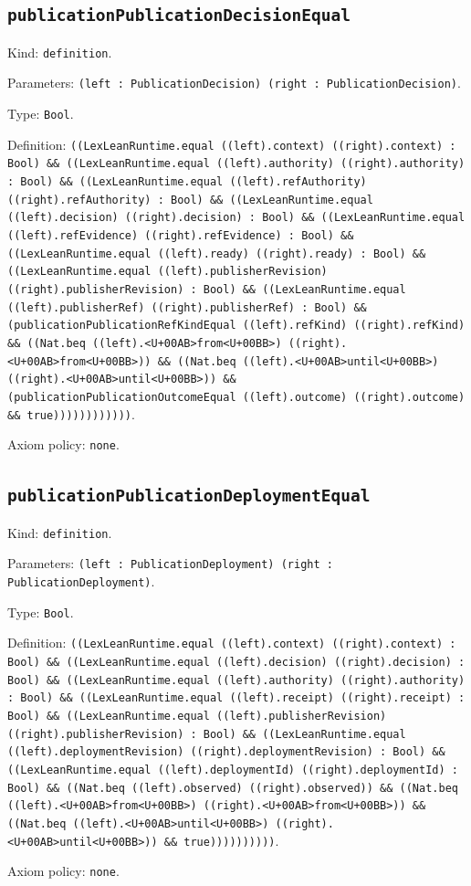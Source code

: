 \documentclass[11pt]{article}
\begin{document}
\subsection*{\texttt{publicationPublicationDecisionEqual}}
\noindent Kind: \texttt{definition}.\par
\noindent Parameters: \texttt{(left : PublicationDecision) (right : PublicationDecision)}.\par
\noindent Type: \texttt{Bool}.\par
\noindent Definition: \texttt{((LexLeanRuntime.equal ((left).context) ((right).context) : Bool) \&\& ((LexLeanRuntime.equal ((left).authority) ((right).authority) : Bool) \&\& ((LexLeanRuntime.equal ((left).refAuthority) ((right).refAuthority) : Bool) \&\& ((LexLeanRuntime.equal ((left).decision) ((right).decision) : Bool) \&\& ((LexLeanRuntime.equal ((left).refEvidence) ((right).refEvidence) : Bool) \&\& ((LexLeanRuntime.equal ((left).ready) ((right).ready) : Bool) \&\& ((LexLeanRuntime.equal ((left).publisherRevision) ((right).publisherRevision) : Bool) \&\& ((LexLeanRuntime.equal ((left).publisherRef) ((right).publisherRef) : Bool) \&\& (publicationPublicationRefKindEqual ((left).refKind) ((right).refKind) \&\& ((Nat.beq ((left).<U+00AB>from<U+00BB>) ((right).<U+00AB>from<U+00BB>)) \&\& ((Nat.beq ((left).<U+00AB>until<U+00BB>) ((right).<U+00AB>until<U+00BB>)) \&\& (publicationPublicationOutcomeEqual ((left).outcome) ((right).outcome) \&\& true))))))))))))}.\par
\noindent Axiom policy: \texttt{none}.\par
\subsection*{\texttt{publicationPublicationDeploymentEqual}}
\noindent Kind: \texttt{definition}.\par
\noindent Parameters: \texttt{(left : PublicationDeployment) (right : PublicationDeployment)}.\par
\noindent Type: \texttt{Bool}.\par
\noindent Definition: \texttt{((LexLeanRuntime.equal ((left).context) ((right).context) : Bool) \&\& ((LexLeanRuntime.equal ((left).decision) ((right).decision) : Bool) \&\& ((LexLeanRuntime.equal ((left).authority) ((right).authority) : Bool) \&\& ((LexLeanRuntime.equal ((left).receipt) ((right).receipt) : Bool) \&\& ((LexLeanRuntime.equal ((left).publisherRevision) ((right).publisherRevision) : Bool) \&\& ((LexLeanRuntime.equal ((left).deploymentRevision) ((right).deploymentRevision) : Bool) \&\& ((LexLeanRuntime.equal ((left).deploymentId) ((right).deploymentId) : Bool) \&\& ((Nat.beq ((left).observed) ((right).observed)) \&\& ((Nat.beq ((left).<U+00AB>from<U+00BB>) ((right).<U+00AB>from<U+00BB>)) \&\& ((Nat.beq ((left).<U+00AB>until<U+00BB>) ((right).<U+00AB>until<U+00BB>)) \&\& true))))))))))}.\par
\noindent Axiom policy: \texttt{none}.\par
\end{document}
